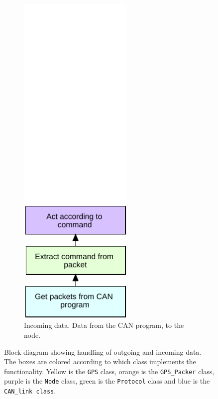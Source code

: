 \begin{figure}[!h]
\begin{subfigure}{0.45\textwidth}
\includegraphics[width=0.60\textwidth]{graphics/FlowChart_Node_Unpacking}
\caption{Incoming data. Data from the CAN program, to the node.}
\label{fig:filter_2}
\end{subfigure}
\caption[Block diagram showing handling of outgoing and incoming data.]{Block diagram showing handling of outgoing and incoming data. The boxes are colored according to which class implements the functionality. 
Yellow is the \texttt{GPS} class, orange is the \texttt{GPS\_Packer} class, purple is the \texttt{Node} class, green is the \texttt{Protocol} class and blue is the \texttt{CAN\_link class}.}
\label{fig:flow_flow}
\end{figure}

